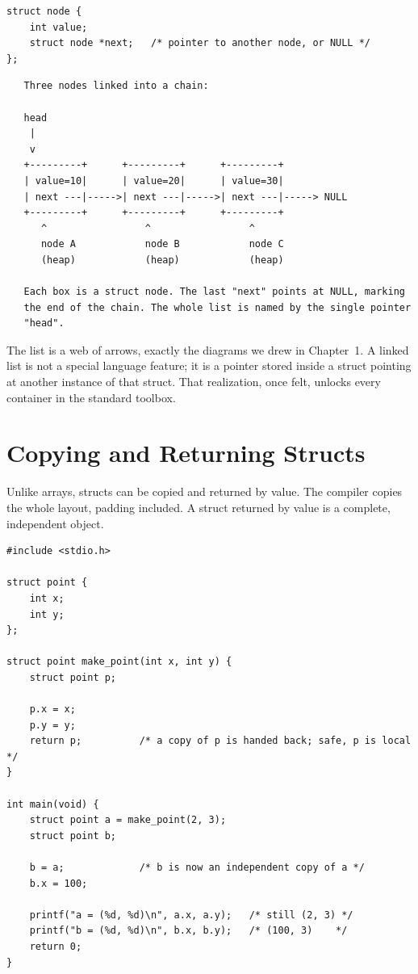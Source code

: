 \begin{lstlisting}[caption={The birth of every linked structure.}]
struct node {
    int value;
    struct node *next;   /* pointer to another node, or NULL */
};
\end{lstlisting}

\begin{verbatim}
   Three nodes linked into a chain:

   head
    |
    v
   +---------+      +---------+      +---------+
   | value=10|      | value=20|      | value=30|
   | next ---|----->| next ---|----->| next ---|-----> NULL
   +---------+      +---------+      +---------+
      ^                 ^                 ^
      node A            node B            node C
      (heap)            (heap)            (heap)

   Each box is a struct node. The last "next" points at NULL, marking
   the end of the chain. The whole list is named by the single pointer
   "head".
\end{verbatim}

The list is a web of arrows, exactly the diagrams we drew in
Chapter~1. A linked list is not a special language feature; it is a
pointer stored inside a struct pointing at another instance of that
struct. That realization, once felt, unlocks every container in the
standard toolbox.

\section{Copying and Returning Structs}

Unlike arrays, structs can be copied and returned by value. The
compiler copies the whole layout, padding included. A struct returned
by value is a complete, independent object.

\begin{lstlisting}[caption={Structs copy and return by value; arrays do not.}]
#include <stdio.h>

struct point {
    int x;
    int y;
};

struct point make_point(int x, int y) {
    struct point p;

    p.x = x;
    p.y = y;
    return p;          /* a copy of p is handed back; safe, p is local */
}

int main(void) {
    struct point a = make_point(2, 3);
    struct point b;

    b = a;             /* b is now an independent copy of a */
    b.x = 100;

    printf("a = (%d, %d)\n", a.x, a.y);   /* still (2, 3) */
    printf("b = (%d, %d)\n", b.x, b.y);   /* (100, 3)    */
    return 0;
}
\end{lstlisting}

